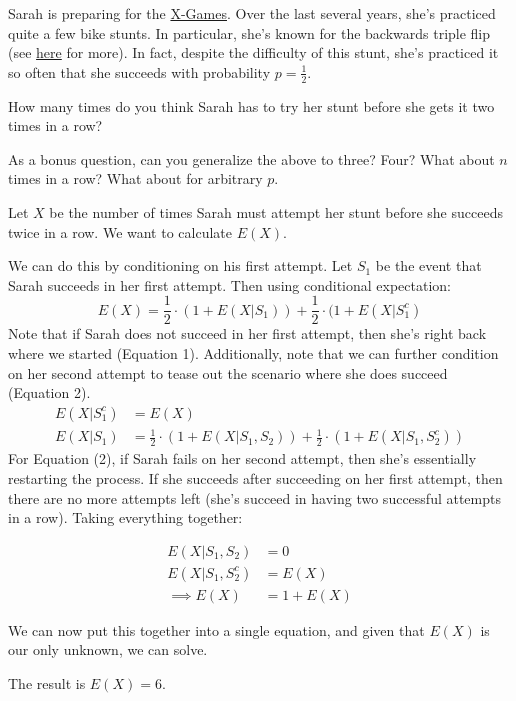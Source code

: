 \documentclass[11pt]{article}
\begin{document}
\begin{exercise}
Sarah is preparing for the \href{http://xgames.espn.go.com/}{X-Games}. Over the last several years, she's practiced quite a few bike stunts. In particular, she's known for the backwards triple flip (see \href{https://www.youtube.com/watch?v=WFLwxGB1qFI}{here} for more). In fact, despite the difficulty of this stunt, she's practiced it so often that she succeeds with probability $p = \frac{1}{2}$.

How many times do you think Sarah has to try her stunt before she gets it two times in a row?

As a bonus question, can you generalize the above to three? Four? What about $n$ times in a row? What about for arbitrary $p$.
\end{exercise}
\begin{solution}
Let $X$ be the number of times Sarah must attempt her stunt before she succeeds twice in a row. We want to calculate $E(X)$.

We can do this by conditioning on his first attempt. Let $S_1$ be the event that Sarah succeeds in her first attempt. Then using conditional expectation:
$$
E(X) = \frac{1}{2} \cdot (1 + E(X|S_1)) + \frac{1}{2} \cdot (1 + E(X|S_1^c)
$$
Note that if Sarah does not succeed in her first attempt, then she's right back where we started (Equation 1). Additionally, note that we can further condition on her second attempt to tease out the scenario where she does succeed (Equation 2).
\begin{align}
E(X|S_1^c) &= E(X) \\
E(X|S_1) &= \frac{1}{2} \cdot (1 + E(X|S_1,S_2)) + \frac{1}{2} \cdot (1 + E(X|S_1,S_2^c))
\end{align}
For Equation (2), if Sarah fails on her second attempt, then she's essentially restarting the process. If she succeeds after succeeding on her first attempt, then there are no more attempts left (she's succeed in having two successful attempts in a row).
Taking everything together:

\begin{align*}
E(X|S_1,S_2) &= 0 \\
E(X|S_1,S_2^c) &= E(X) \\
\implies E(X) &= 1 + E(X)
\end{align*}

We can now put this together into a single equation, and given that $E(X)$ is our only unknown, we can solve.

The result is $E(X) = 6$.
\end{solution}
\end{document}
